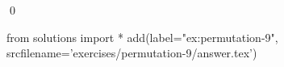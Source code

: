 
\begin{ex} 
  \label{ex:permutation-9}
  
  \qed
\end{ex} 
\begin{python0}
from solutions import *
add(label="ex:permutation-9",
    srcfilename='exercises/permutation-9/answer.tex') 
\end{python0}
